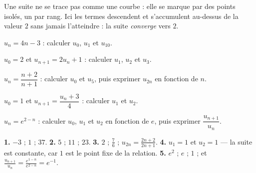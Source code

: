 \begin{visualisation}
\begin{center}
\end{center}

Une suite ne se trace pas comme une courbe : elle se marque par des points
isolés, un par rang. Ici les termes descendent et s'accumulent au-dessus de
la valeur $2$ sans jamais l'atteindre : la suite \emph{converge} vers $2$.
\end{visualisation}

\begin{entrainement}
\exo[\niveau{1}] $u_{n} = 4n-3$ : calculer $u_{0}$, $u_{1}$ et $u_{10}$.

\exo[\niveau{1}] $u_{0} = 2$ et $u_{n+1} = 2u_{n}+1$ : calculer $u_{1}$,
$u_{2}$ et $u_{3}$.

\exo[\niveau{2}] $u_{n} = \dfrac{n+2}{n+1}$ : calculer $u_{0}$ et $u_{5}$,
puis exprimer $u_{2n}$ en fonction de $n$.

\exo[\niveau{2}] $u_{0} = 1$ et $u_{n+1} = \dfrac{u_{n}+3}{4}$ : calculer
$u_{1}$ et $u_{2}$.

\exo[\niveau{3}] $u_{n} = e^{2-n}$ : calculer $u_{0}$, $u_{1}$ et $u_{2}$ en
fonction de $e$, puis exprimer $\dfrac{u_{n+1}}{u_{n}}$.
\end{entrainement}

\begin{corrige}
\textbf{1.} $-3$ ; $1$ ; $37$.
\textbf{2.} $5$ ; $11$ ; $23$.
\textbf{3.} $2$ ; $\frac76$ ; $u_{2n} = \frac{2n+2}{2n+1}$.
\textbf{4.} $u_{1} = 1$ et $u_{2} = 1$ — la suite est constante, car $1$ est
le point fixe de la relation.
\textbf{5.} $e^{2}$ ; $e$ ; $1$ ; et
$\frac{u_{n+1}}{u_{n}} = \frac{e^{1-n}}{e^{2-n}} = e^{-1}$.
\end{corrige}

